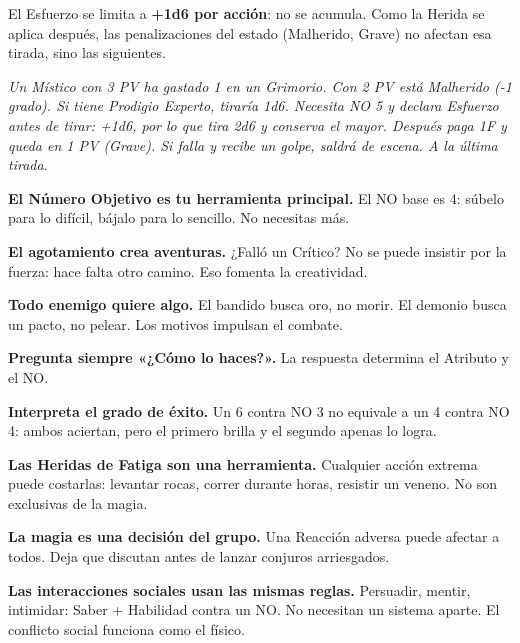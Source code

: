 \documentclass[10pt,a4paper]{article}
\begin{document}
El Esfuerzo se limita a \textbf{+1d6 por acción}: no se acumula. Como la Herida se aplica después, las penalizaciones del estado (Malherido, Grave) no afectan esa tirada, sino las siguientes.

\textit{Un Místico con 3 PV ha gastado 1 en un Grimorio. Con 2 PV está Malherido (-1 grado). Si tiene Prodigio Experto, tiraría 1d6. Necesita NO 5 y declara Esfuerzo antes de tirar: +1d6, por lo que tira 2d6 y conserva el mayor. Después paga 1F y queda en 1 PV (Grave). Si falla y recibe un golpe, saldrá de escena. A la última tirada.}

\textbf{El Número Objetivo es tu herramienta principal.} El NO base es 4: súbelo para lo difícil, bájalo para lo sencillo. No necesitas más.


\textbf{El agotamiento crea aventuras.} ¿Falló un Crítico? No se puede insistir por la fuerza: hace falta otro camino. Eso fomenta la creatividad.


\textbf{Todo enemigo quiere algo.} El bandido busca oro, no morir. El demonio busca un pacto, no pelear. Los motivos impulsan el combate.


\textbf{Pregunta siempre «¿Cómo lo haces?».} La respuesta determina el Atributo y el NO.


\textbf{Interpreta el grado de éxito.} Un 6 contra NO 3 no equivale a un 4 contra NO 4: ambos aciertan, pero el primero brilla y el segundo apenas lo logra.


\textbf{Las Heridas de Fatiga son una herramienta.} Cualquier acción extrema puede costarlas: levantar rocas, correr durante horas, resistir un veneno. No son exclusivas de la magia.


\textbf{La magia es una decisión del grupo.} Una Reacción adversa puede afectar a todos. Deja que discutan antes de lanzar conjuros arriesgados.


\textbf{Las interacciones sociales usan las mismas reglas.} Persuadir, mentir, intimidar: Saber + Habilidad contra un NO. No necesitan un sistema aparte. El conflicto social funciona como el físico.

\end{document}
